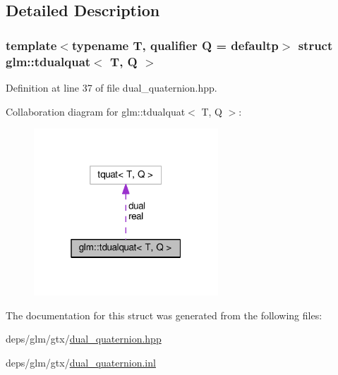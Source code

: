 \subsection{Detailed Description}
\subsubsection*{template$<$typename T, qualifier Q = defaultp$>$\newline
struct glm\+::tdualquat$<$ T, Q $>$}



Definition at line 37 of file dual\+\_\+quaternion.\+hpp.



Collaboration diagram for glm\+:\+:tdualquat$<$ T, Q $>$\+:
\nopagebreak
\begin{figure}[H]
\begin{center}
\leavevmode
\includegraphics[width=196pt]{de/da9/structglm_1_1tdualquat__coll__graph}
\end{center}
\end{figure}


The documentation for this struct was generated from the following files\+:\begin{DoxyCompactItemize}
\item 
deps/glm/gtx/\hyperlink{dual__quaternion_8hpp}{dual\+\_\+quaternion.\+hpp}\item 
deps/glm/gtx/\hyperlink{dual__quaternion_8inl}{dual\+\_\+quaternion.\+inl}\end{DoxyCompactItemize}
